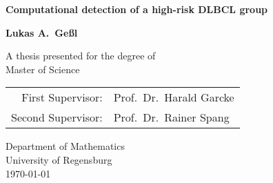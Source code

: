 \documentclass[10.5pt, a4paper, oneside]{report}
\begin{document}
    \begin{titlepage}
        \centering
        \vspace*{1cm}
        
        \huge
        \textsf{
        \textbf{Computational detection of a high-risk DLBCL group}
        }
        
        \vspace{1.5cm}
        
        \large
        \textbf{Lukas A.\ Geßl}
        
        \vfill
        
        \large
        A thesis presented for the degree of\\
        Master of Science
        
        \vspace{0.8cm}
        
        \begin{tabular}{rl}
            First Supervisor: & Prof.\ Dr.\ Harald Garcke \\
            Second Supervisor: & Prof.\ Dr.\ Rainer Spang \\
        \end{tabular}
        
        \vspace{0.8cm}
        
        Department of Mathematics\\
        University of Regensburg\\
        \vspace{0.8cm}
        \today
        
    \end{titlepage}

    \tableofcontents
    
    
    
    

    
\end{document}
